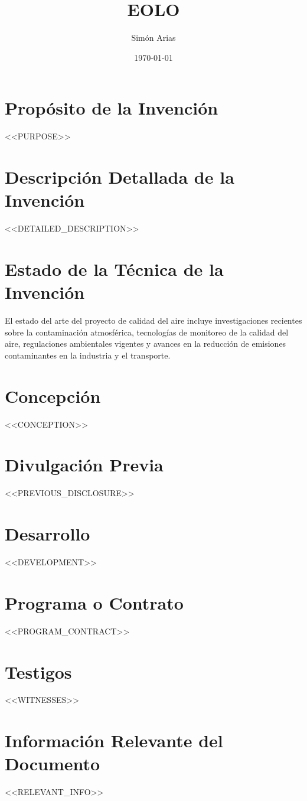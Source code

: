 \documentclass{article}
\title{EOLO}
\author{Simón Arias}
\date{\today}
\begin{document}
\maketitle

\section*{Propósito de la Invención}
<<PURPOSE>>

\section*{Descripción Detallada de la Invención}
<<DETAILED_DESCRIPTION>>

\section*{Estado de la Técnica de la Invención}
El estado del arte del proyecto de calidad del aire incluye investigaciones recientes sobre la contaminación atmosférica, tecnologías de monitoreo de la calidad del aire, regulaciones ambientales vigentes y avances en la reducción de emisiones contaminantes en la industria y el transporte.

\section*{Concepción}
<<CONCEPTION>>

\section*{Divulgación Previa}
<<PREVIOUS_DISCLOSURE>>

\section*{Desarrollo}
<<DEVELOPMENT>>

\section*{Programa o Contrato}
<<PROGRAM_CONTRACT>>

\section*{Testigos}
<<WITNESSES>>

\section*{Información Relevante del Documento}
<<RELEVANT_INFO>>
\end{document}
